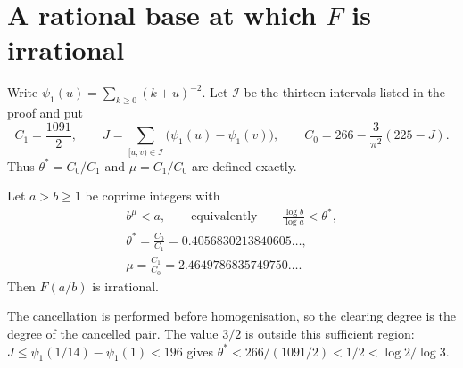 \documentclass[11pt]{article}
\begin{document}
\section{A rational base at which $F$ is irrational}
\label{sec:rational-base-irrationality}

Write $\psi_1(u)=\sum_{k\ge0}(k+u)^{-2}$.  Let $\mathcal I$ be the thirteen
intervals listed in the proof and put
\[
 C_1=\frac{1091}{2},\qquad
 J=\sum_{[u,v)\in\mathcal I}\bigl(\psi_1(u)-\psi_1(v)\bigr),\qquad
 C_0=266-\frac3{\pi^2}(225-J).
\]
Thus $\theta^*=C_0/C_1$ and $\mu=C_1/C_0$ are defined exactly.


\begin{theorem}
\label{res:rational-base-threshold}
Let $a>b\ge1$ be coprime integers with
\[
\begin{gathered}
 b^{\mu}<a,\qquad\text{equivalently}\qquad
 \frac{\log b}{\log a}<\theta^*,\\
 \theta^*=\frac{C_0}{C_1}=0.4056830213840605\ldots,\\
 \mu=\frac{C_1}{C_0}=2.4649786835749750\ldots.
\end{gathered}
\]
Then $F(a/b)$ is irrational.
\end{theorem}

\noindent The cancellation is performed before homogenisation, so the
clearing degree is the degree of the cancelled pair.  The value $3/2$ is
outside this sufficient region: $J\le\psi_1(1/14)-\psi_1(1)<196$ gives
$\theta^*<266/(1091/2)<1/2<\log2/\log3$.
\end{document}
